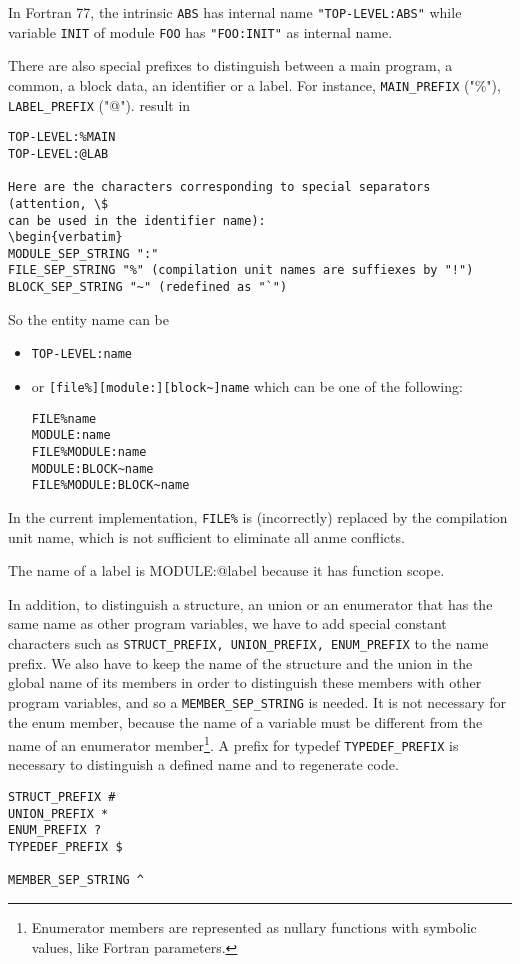 \documentclass[a4paper]{report}
\begin{document}
In Fortran 77, the intrinsic \verb/ABS/ has internal name
\verb/"TOP-LEVEL:ABS"/ while variable \verb/INIT/ of module \verb/FOO/
has \verb/"FOO:INIT"/ as internal name.

There are also special prefixes to distinguish between a main program,
a common, a block data, an identifier or a label. For instance,
\verb/MAIN_PREFIX/ ("\%"), \verb/LABEL_PREFIX/ ("@"). result in
\begin{verbatim}
TOP-LEVEL:%MAIN
TOP-LEVEL:@LAB

Here are the characters corresponding to special separators (attention, \$
can be used in the identifier name): 
\begin{verbatim}
MODULE_SEP_STRING ":"
FILE_SEP_STRING "%" (compilation unit names are suffiexes by "!")
BLOCK_SEP_STRING "~" (redefined as "`")
\end{verbatim}  

So the entity name can be 
\begin{itemize}
\item 
\verb/TOP-LEVEL:name/
\item or 
\verb/[file%][module:][block~]name/ which can be one of the following: 
\begin{verbatim}
FILE%name
MODULE:name
FILE%MODULE:name
MODULE:BLOCK~name
FILE%MODULE:BLOCK~name
\end{verbatim}  
\end{itemize} 
In the current implementation, \verb/FILE%/ is (incorrectly) replaced
 by the compilation unit name, which is not sufficient to eliminate
 all anme conflicts.

The name of a label is MODULE:@label because it has function scope. 

In addition, to distinguish a structure, an union or an enumerator
that has the same name as other program variables, we have to add
special constant characters such as
\verb/STRUCT_PREFIX, UNION_PREFIX, ENUM_PREFIX/ to the name prefix. We
also have to keep the name of the structure and the union in the
global name of its members in order to distinguish these members with
other program variables, and so a \verb/MEMBER_SEP_STRING/ is needed.
It is not necessary for the enum member, because the name of a
variable must be different from the name of an enumerator
member\footnote{Enumerator members are represented as nullary
  functions with symbolic values, like Fortran parameters.}.  A prefix
for typedef \verb/TYPEDEF_PREFIX/ is necessary to distinguish a
defined name and to regenerate code.
\begin{verbatim}
STRUCT_PREFIX #
UNION_PREFIX *
ENUM_PREFIX ?
TYPEDEF_PREFIX $

MEMBER_SEP_STRING ^
\end{verbatim}
\end{document}

